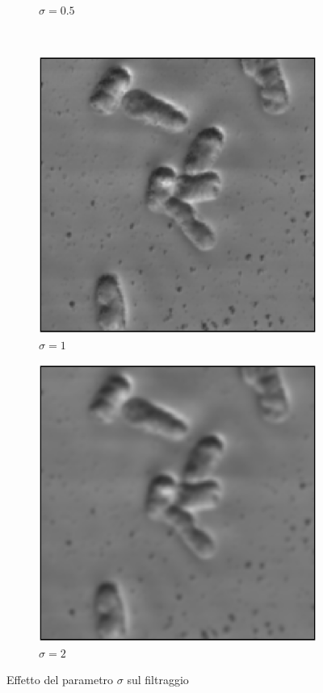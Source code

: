 \documentclass[../main.tex]{subfiles}
\begin{document}
\begin{enumerate}
\begin{figure}[ht]
\begin{subfigure}{0.4\linewidth}
			\caption{$\sigma = 0.5$}
		\end{subfigure}\\[4pt]
		\begin{subfigure}{0.4\linewidth}
			\includegraphics[keepaspectratio, width=\linewidth]{images/gauss_1.png}
			\caption{$\sigma = 1$}
		\end{subfigure}
		\hspace{10pt}
		\begin{subfigure}{0.4\linewidth}
			\includegraphics[keepaspectratio, width=\linewidth]{images/gauss_2.png}
			\caption{$\sigma = 2$}
		\end{subfigure}
		\caption{Effetto del parametro $\sigma$ sul filtraggio}
	\end{figure}


\end{enumerate}
\end{document}
